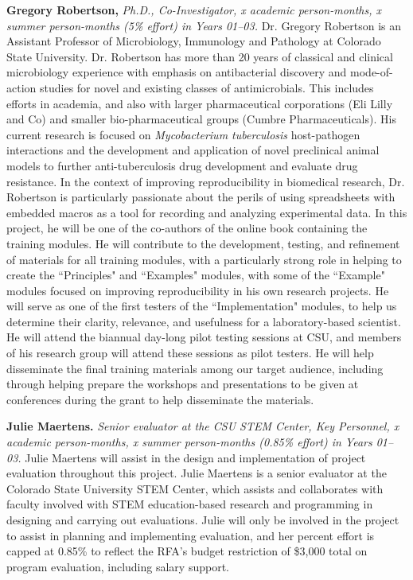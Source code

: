 \documentclass[pdftex,english,11pt,parskip=half]{scrartcl}
\begin{document}
\noindent \textbf{Gregory Robertson,} \textit{Ph.D., Co-Investigator, x academic person-months, x summer person-months (5\% effort) in Years 01--03.} Dr. Gregory Robertson is an Assistant Professor of Microbiology, Immunology and Pathology at Colorado State University. Dr. Robertson has more than 20 years of classical and clinical microbiology experience with emphasis on antibacterial discovery and mode-of-action studies for novel and existing classes of antimicrobials. This includes efforts in academia, and also with larger pharmaceutical corporations (Eli Lilly and Co) and smaller bio-pharmaceutical groups (Cumbre Pharmaceuticals). His current research is focused on \textit{Mycobacterium tuberculosis} host-pathogen interactions and the development and application of novel preclinical animal models to further anti-tuberculosis drug development and evaluate drug resistance. In the context of improving reproducibility in biomedical research, Dr. Robertson is particularly passionate about the perils of using spreadsheets with embedded macros as a tool for recording and analyzing experimental data. In this project, he will be one of the co-authors of the online book containing the training modules. He will contribute to the development, testing, and refinement of materials for all training modules, with a particularly strong role in helping to create the ``Principles" and ``Examples" modules, with some of the ``Example" modules focused on improving reproducibility in his own research projects. He will serve as one of the first testers of the ``Implementation" modules, to help us determine their clarity, relevance, and usefulness for a laboratory-based scientist. He will attend the biannual day-long pilot testing sessions at CSU, and members of his research group will attend these sessions as pilot testers. He will help disseminate the final training materials among our target audience, including through helping prepare the workshops and presentations to be given at conferences during the grant to help disseminate the materials. 

\noindent \textbf{Julie Maertens.} \textit{Senior evaluator at the CSU STEM Center, Key Personnel, x academic person-months, x summer person-months (0.85\% effort) in Years 01--03.} Julie Maertens will assist in the design and implementation of project evaluation throughout this project. Julie Maertens is a senior evaluator at the Colorado State University STEM Center, which assists and collaborates with faculty involved with STEM education-based research and programming in designing and carrying out evaluations. Julie will only be involved in the project to assist in planning and implementing evaluation, and her percent effort is capped at 0.85\% to reflect the RFA's budget restriction of \$3,000 total on program evaluation, including salary support.
\end{document}
